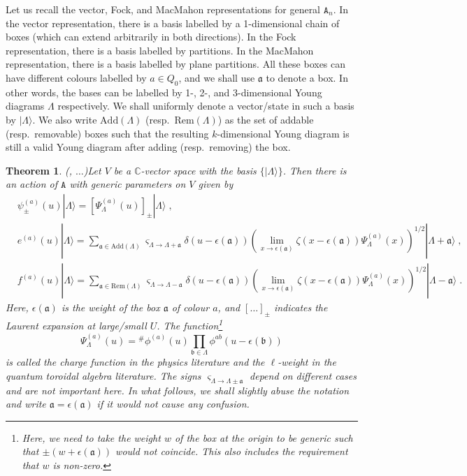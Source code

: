 \documentclass[11pt]{article}
\numberwithin{equation}{section}
\numberwithin{figure}{section}
\numberwithin{table}{section}
\newtheorem{theorem}{Theorem}[section]
\begin{document}
Let us recall the vector, Fock, and MacMahon representations for general $\mathtt{A}_n$. In the vector representation, there is a basis labelled by a 1-dimensional chain of boxes (which can extend arbitrarily in both directions). In the Fock representation, there is a basis labelled by partitions. In the MacMahon representation, there is a basis labelled by plane partitions. All these boxes can have different colours labelled by $a\in Q_0$, and we shall use $\mathfrak{a}$ to denote a box. In other words, the bases can be labelled by 1-, 2-, and 3-dimensional Young diagrams $\Lambda$ respectively. We shall uniformly denote a vector/state in such a basis by $|\Lambda\rangle$. We also write $\mathrm{Add}(\Lambda)$ (resp.~$\mathrm{Rem}(\Lambda)$) as the set of addable (resp.~removable) boxes such that the resulting $k$-dimensional Young diagram is still a valid Young diagram after adding (resp.~removing) the box.
\begin{theorem}{(\cite{Feigin:2010qea,feigin2013representations,tsymbaliuk2017affine,Li:2020rij,Noshita:2021ldl,Galakhov:2021vbo,jimbo2024combinatorial,laurie2024a}, $\dots$)}\label{crystalrep}
	Let $V$ be a $\mathbb{C}$-vector space with the basis $\{|\Lambda\rangle\}$. Then there is an action of $\mathtt{A}$ with generic parameters on $V$ given by
	\begin{subequations}
		\begin{align}
			&\psi^{(a)}_{\pm}(u)|\Lambda\rangle=\left[\Psi^{(a)}_\Lambda(u)\right]_\pm|\Lambda\rangle\;,\\
			&e^{(a)}(u)|\Lambda\rangle=\sum_{\mathfrak{a}\in\mathrm{Add}(\Lambda)}\varsigma_{\Lambda\rightarrow\Lambda+\mathfrak{a}}\delta(u-\epsilon(\mathfrak{a}))\left(\lim_{x\rightarrow\epsilon(\mathfrak{a})}\zeta(x-\epsilon(\mathfrak{a}))\Psi^{(a)}_\Lambda(x)\right)^{1/2}|\Lambda+\mathfrak{a}\rangle\;,\\
			&f^{(a)}(u)|\Lambda\rangle=\sum_{\mathfrak{a}\in\mathrm{Rem}(\Lambda)}\varsigma_{\Lambda\rightarrow\Lambda-\mathfrak{a}}\delta(u-\epsilon(\mathfrak{a}))\left(\lim_{x\rightarrow\epsilon(\mathfrak{a})}\zeta(x-\epsilon(\mathfrak{a}))\Psi^{(a)}_\Lambda(x)\right)^{1/2}|\Lambda-\mathfrak{a}\rangle\;.
		\end{align}
	\end{subequations}
	Here, $\epsilon(\mathfrak{a})$ is the weight of the box $\mathfrak{a}$ of colour $a$, and $[\dots]_{\pm}$ indicates the Laurent expansion at large/small $U$. The function\footnote{Here, we need to take the weight $w$ of the box at the origin to be generic such that $\pm(w+\epsilon(\mathfrak{a}))$ would not coincide. This also includes the requirement that $w$ is non-zero.}
	\begin{equation}
		\Psi^{(a)}_\Lambda(u)={}^\#\phi^{(a)}(u)\prod_{\mathfrak{b}\in\Lambda}\phi^{ab}(u-\epsilon(\mathfrak{b}))
	\end{equation}
	is called the charge function in the physics literature and the $\ell$-weight in the quantum toroidal algebra literature. The signs $\varsigma_{\Lambda\rightarrow\Lambda\pm\mathfrak{a}}$ depend on different cases and are not important here. In what follows, we shall slightly abuse the notation and write $\mathfrak{a}=\epsilon(\mathfrak{a})$ if it would not cause any confusion.
\end{theorem}
\end{document}
